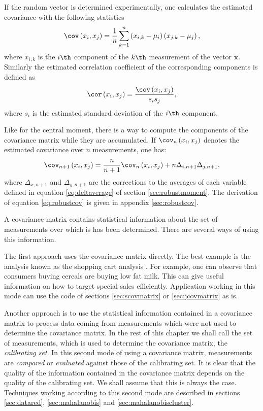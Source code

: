 If the random vector is determined experimentally, one calculates
the estimated covariance with the following statistics
\begin{equation}
 \cov\left(x_i,x_j\right)={1\over n}\sum_{k=1}^n
 \left(x_{i,k}-\mu_i\right)\left(x_{j,k}-\mu_j\right),
\end{equation}
where $x_{i,k}$ is the $i\th$ component of the $k\th$ measurement
of the vector $\textbf{x}$. Similarly the estimated correlation
coefficient of the corresponding components is defined as
\begin{equation}
 \cor\left(x_i,x_j\right)={\cov\left(x_i,x_j\right)\over s_i s_j},
\end{equation}
where $s_i$ is the estimated standard deviation of the $i\th$
component.

Like for the central moment, there is a way to compute the
components of the covariance matrix while they are accumulated. If
${\cov}_n\left(x_i,x_j\right)$ denotes the estimated covariance
over $n$ measurements, one has:
\begin{equation}
\label{eq:robustcov}
 {\cov}_{n+1}\left(x_i,x_j\right)={n\over
 n+1}{\cov}_n\left(x_i,x_j\right)+n\Delta_{i,n+1}\Delta_{j,n+1},
\end{equation}
where $\Delta_{x,n+1}$ and $\Delta_{y,n+1}$ are the corrections to
the averages of each variable defined in equation
\ref{eq:deltaverage} of section \ref{sec:robustmoment}. The
derivation of equation \ref{eq:robustcov} is given in appendix
\ref{sec:robustcov}.

 A covariance matrix
contains statistical information about the set of measurements
over which is has been determined. There are several ways of using
this information.

The first approach uses the covariance matrix directly. The best
example is the analysis known as the shopping cart analysis
\cite{BerLin}. For example, one can observe that consumers buying
cereals are buying low fat milk. This can give useful information
on how to target special sales efficiently. Application working in
this mode can use the code of sections \ref{sec:scovmatrix} or
\ref{sec:jcovmatrix} as is.

Another approach is to use the statistical information contained
in a covariance matrix to process data coming from measurements
which were not used to determine the covariance matrix. In the
rest of this chapter we shall call the set of measurements, which
is used to determine the covariance matrix, the \textsl{calibrating
set}. In this second mode of using a covariance matrix,
measurements are \textsl{compared} or \textsl{evaluated} against those
of the calibrating set. It is clear that the quality of the
information contained in the covariance matrix depends on the
quality of the calibrating set. We shall assume that this is
always the case. Techniques working according to this second mode
are described in sections \ref{sec:datared}, \ref{sec:mahalanobis}
and \ref{sec:mahalanobiscluster}.


